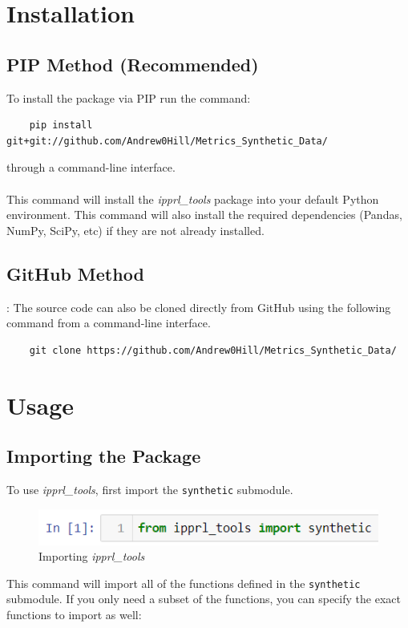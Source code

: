 \documentclass[titlepage, 11pt]{article}
\newcommand{\pkgname}{\textit{ipprl\_tools}}
\begin{document}
\section{Installation}

\subsection{PIP Method (Recommended)}
To install the package via PIP run the command:
\begin{verbatim}
    pip install git+git://github.com/Andrew0Hill/Metrics_Synthetic_Data/
\end{verbatim}
through a command-line interface.
\\
\\
\noindent This command will install the \pkgname{} package into your default Python environment. This command will also install the required dependencies (Pandas, NumPy, SciPy, etc) if they are not already installed. 

\subsection{GitHub Method}: 
The source code can also be cloned directly from GitHub using the following command from a command-line interface.

\begin{verbatim}
    git clone https://github.com/Andrew0Hill/Metrics_Synthetic_Data/
\end{verbatim}

\section{Usage}
\subsection{Importing the Package}
To use \pkgname{}, first import the \verb|synthetic| submodule. 
\begin{figure}[H]
    \centering
    \includegraphics{imgs/Import}
    \caption{Importing \pkgname{}}
    \label{fig:my_label}
\end{figure}

\noindent This command will import all of the functions defined in the \verb|synthetic| submodule. If you only need a subset of the functions, you can specify the exact functions to import as well:
\end{document}

